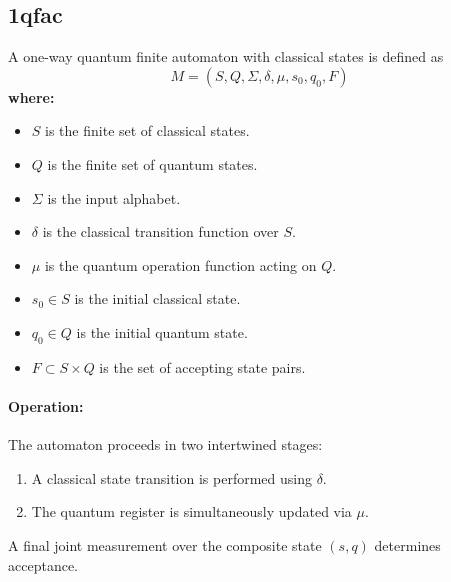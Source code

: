 

\subsection{\acrfull{1qfac}}
\label{subsec:1qfac}
\begin{definition}
A one-way quantum finite automaton with classical states is defined as 
\[
M = (S, Q, \Sigma, \delta, \mu, s_0, q_0, F)
\]
\textbf{where:}
\begin{itemize}
    \item \( S \) is the finite set of classical states.
    \item \( Q \) is the finite set of quantum states.
    \item \( \Sigma \) is the input alphabet.
    \item \( \delta \) is the classical transition function over \( S \).
    \item \( \mu \) is the quantum operation function acting on \( Q \).
    \item \( s_0 \in S \) is the initial classical state.
    \item \( q_0 \in Q \) is the initial quantum state.
    \item \( F \subset S \times Q \) is the set of accepting state pairs.
\end{itemize}
\end{definition}

\paragraph{Operation:}  
The automaton proceeds in two intertwined stages:
\begin{enumerate}
    \item A classical state transition is performed using \( \delta \).
    \item The quantum register is simultaneously updated via \( \mu \).
\end{enumerate}
A final joint measurement over the composite state \( (s, q) \) determines acceptance.

